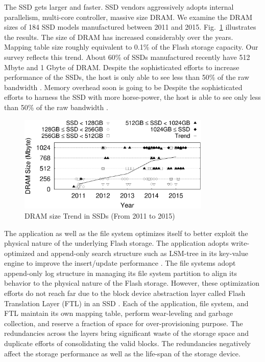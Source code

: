 \documentclass[prodmode,acmtecs]{acmsmall}
\begin{document}
The SSD gets larger and faster. SSD vendors aggressively adopts
internal parallelism, multi-core controller, massive size DRAM.  We
examine the DRAM sizes of 184 SSD models manufactured between 2011 and
2015.
Fig.~\ref{fig:dram_size} illustrates the results. 
The size of DRAM has increased considerably over the years. Mapping
table size roughly equivalent to 0.1\% of the Flash storage
capacity. Our survey reflects this trend. About
60$\%$ of SSDs manufactured recently have 512 Mbyte and 1
Gbyte of DRAM. Despite the sophisticated efforts to increase performance of the SSDs, 
the host is only able to see less than 50\% of the raw bandwidth \cite{sdf}.
Memory overhead soon is going to be   Despite the sophisticated efforts
to harness the SSD with more horse-power, the host is able to see only
less than 50\% of the raw bandwidth \cite{sdf}.

\begin{figure}[t]
\begin{center}
\includegraphics[width=3.6in]{./figure/dram_size.eps}
\caption{DRAM size Trend in SSDs (From 2011 to 2015)}
\label{fig:dram_size}
\end{center}
\end{figure}

The application as well as the file system optimizes itself to better
exploit the physical nature of the underlying Flash storage. The
application adopts write-optimized and append-only search structure
such as LSM-tree \cite{o1996log} in its key-value engine to improve the
insert/update performance \cite{chang2008bigtable,cassandraDB,mongodb,rocksdb}. 
The file systems adopt append-only log structure
in managing its file system partition \cite{lee2015f2fs,nilfs2006} to align its behavior to the
physical nature of the Flash storage. However, these optimization
efforts do not reach far due to the block device abstraction layer
called Flash Translation Layer (FTL) in an SSD  \cite{last08,dftl09,kang2006superblock}. 
Each of the application, file system, and FTL
maintain its own mapping table, perform wear-leveling and garbage
collection, and reserve a fraction of space for over-provisioning
purpose. The redundancies across the layers bring significant waste of
the storage space and duplicate efforts of consolidating the valid
blocks. The redundancies negatively affect the storage performance as
well as the life-span of the storage device.
\end{document}
